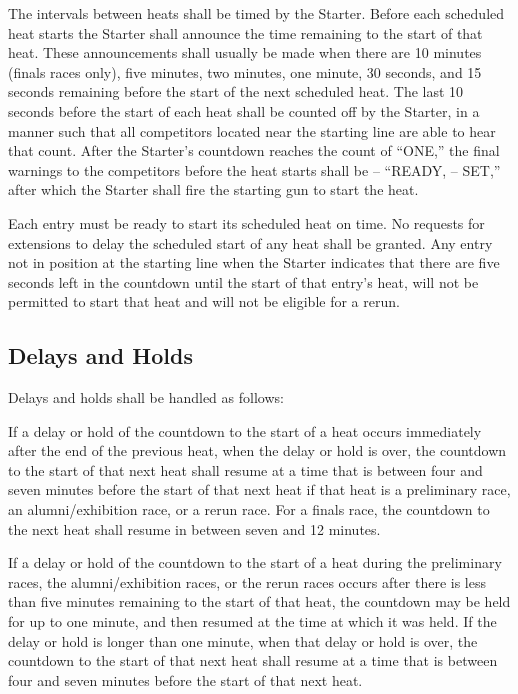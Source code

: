 	The intervals between heats shall be timed by the Starter. Before each scheduled heat starts the Starter shall announce the time remaining to the start of that heat. These announcements shall usually be made when there are 10 minutes (finals races only), five minutes, two minutes, one minute, 30 seconds, and 15 seconds remaining before the start of the next scheduled heat. The last 10 seconds before the start of each heat shall be counted off by the Starter, in a manner such that all competitors located near the starting line are able to hear that count. After the Starter's countdown reaches the count of ``ONE,'' the final warnings to the competitors before the heat starts shall be -- ``READY, -- SET,'' after which the Starter shall fire the starting gun to start the heat.

	Each entry must be ready to start its scheduled heat on time. No requests for extensions to delay the scheduled start of any heat shall be granted. Any entry not in position at the starting line when the Starter indicates that there are five seconds left in the countdown until the start of that entry's heat, will not be permitted to start that heat and will not be eligible for a rerun.

\subsection{Delays and Holds}

	Delays and holds shall be handled as follows:
	\newline

	If a delay or hold of the countdown to the start of a heat occurs immediately after the end of the previous heat, when the delay or hold is over, the countdown to the start of that next heat shall resume at a time that is between four and seven minutes before the start of that next heat if that heat is a preliminary race, an alumni/exhibition race, or a rerun race. For a finals race, the countdown to the next heat shall resume in between seven and 12 minutes.

	If a delay or hold of the countdown to the start of a heat during the preliminary races, the alumni/exhibition races, or the rerun races occurs after there is less than five minutes remaining to the start of that heat, the countdown may be held for up to one minute, and then resumed at the time at which it was held. If the delay or hold is longer than one minute, when that delay or hold is over, the countdown to the start of that next heat shall resume at a time that is between four and seven minutes before the start of that next heat.

